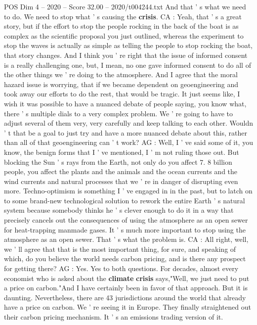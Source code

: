 \begin{textsample}{POS Dim 4 – 2020 – Score 32.00 – 2020/t004244.txt}
And that ' s what we need to do.
We need to stop what ' s causing the \textbf{crisis}.
CA : Yeah, that ' s a great story, but if the effort to stop the people rocking in the back of the boat is as complex as the scientific proposal you just outlined, whereas the experiment to stop the waves is actually as simple as telling the people to stop rocking the boat, that story changes.
And I think you ' re right that the issue of informed consent is a really challenging one, but, I mean, no one gave informed consent to do all of the other things we ' re doing to the atmosphere.
And I agree that the moral hazard issue is worrying, that if we became dependent on geoengineering and took away our efforts to do the rest, that would be tragic.
It just seems like, I wish it was possible to have a nuanced debate of people saying, you know what, there ' s multiple dials to a very complex problem.
We ' re going to have to adjust several of them very, very carefully and keep talking to each other.
Wouldn ' t that be a goal to just try and have a more nuanced debate about this, rather than all of that geoengineering can ' t work?
AG : Well, I ' ve said some of it, you know, the benign forms that I ' ve mentioned, I ' m not ruling those out.
But blocking the Sun ' s rays from the Earth, not only do you affect 7. 8 billion people, you affect the plants and the animals and the ocean currents and the wind currents and natural processes that we ' re in danger of disrupting even more.
Techno-optimism is something I ' ve engaged in in the past, but to latch on to some brand-new technological solution to rework the entire Earth ' s natural system because somebody thinks he ' s clever enough to do it in a way that precisely cancels out the consequences of using the atmosphere as an open sewer for heat-trapping manmade gases.
It ' s much more important to stop using the atmosphere as an open sewer.
That ' s what the problem is.
CA : All right, well, we ' ll agree that that is the most important thing, for sure, and speaking of which, do you believe the world needs carbon pricing, and is there any prospect for getting there?
AG : Yes.
Yes to both questions.
For decades, almost every economist who is asked about the \textbf{climate} \textbf{crisis} says,"Well, we just need to put a price on carbon."And I have certainly been in favor of that approach.
But it is daunting.
Nevertheless, there are 43 jurisdictions around the world that already have a price on carbon.
We ' re seeing it in Europe.
They finally straightened out their carbon pricing mechanism.
It ' s an emissions trading version of it.

\end{textsample}
